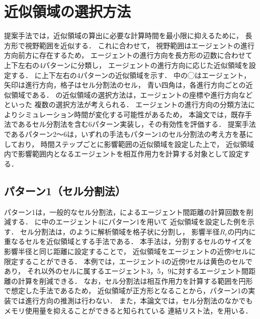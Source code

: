 \section{近似領域の選択方法}
提案手法では，近似領域の算出に必要な計算時間を最小限に抑えるために，
長方形で視野範囲を近似する．
これに合わせて，
視野範囲はエージェントの進行方向前方に存在するため，
エージェントの進行方向を長方形の辺数に合わせて上下左右の4パターンに分類し，
エージェントの進行方向に応じた近似領域を設定する．
に上下左右の4パターンの近似領域を示す．
中の◯はエージェント，矢印は進行方向，格子はセル分割法のセル，
青い四角は，各進行方向ごとの近似領域である．
の近似領域の選択方法は，エージェントの座標や進行方向などといった
複数の選択方法が考えられる．
エージェントの進行方向の分類方法によりシミュレーション時間が変化する可能性があるため，
本論文では，既存手法であるセル分割法を含む6パターン実装し，その有効性を評価する．
提案手法であるパターン2～6は，いずれの手法もパターン1のセル分割法の考え方を基にしており，
時間ステップごとに影響範囲の近似領域を設定した上で，
近似領域内で影響範囲内となるエージェントを相互作用力を計算する対象として設定する．



\subsection{パターン1（セル分割法）}
パターン1は，一般的なセル分割法\cite{cell1}，\cite{cell2}によるエージェント間距離の計算回数を削減する．
に中のエージェント4にパターン1を用いて
近似領域を設定した例を示す．
セル分割法は，のように解析領域を格子状に分割し，
影響半径$R_{c}$の円内に重なるセルを近似領域とする手法である．
本手法は，分割するセルのサイズを影響半径と同じ距離に設定することで，
近似領域をエージェントの近傍9セルに限定することができる．
本例では，エージェント4の近傍9セルは黄色のセルであり，
それ以外のセルに属するエージェント3，5，9に対するエージェント間距離の計算を削減できる．
なお，セル分割法は相互作用力を計算する範囲を円形で想定した手法であるため，
近似領域が正方形となることから，パターン1の実装では進行方向の推測は行わない．
また，本論文では，セル分割法のなかでもメモリ使用量を抑えることができると知られている
連結リスト法\cite{cell_book1}，\cite{cell_renketu}を用いる．

